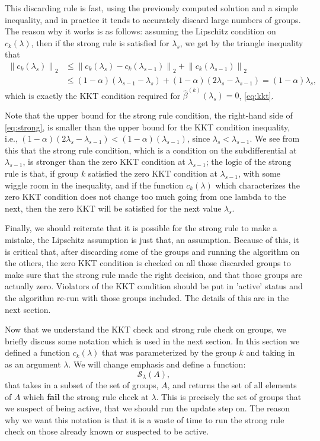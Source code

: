 \documentclass[12pt]{article}
\newcommand{\norm}[1]{\left\lVert #1 \right\rVert}
\begin{document}
This discarding rule is fast, using the previously computed solution and a simple inequality, and in practice it tends to accurately discard large numbers of groups. The reason why it works is as follows: assuming the Lipschitz condition on $c_k(\lambda)$, then if the strong rule is satisfied for $\lambda_s$, we get by the triangle inequality that
\begin{align*}
\norm{c_k(\lambda_s)}_2 &\leq \norm{c_k(\lambda_s) - c_k(\lambda_{s-1})}_2 + \norm{c_k(\lambda_{s-1})}_2 \\
&\leq (1-\alpha)(\lambda_{s-1} - \lambda_s) + (1-\alpha)(2\lambda_s - \lambda_{s-1})
=(1-\alpha)\lambda_s,
\end{align*}
which is exactly the KKT condition required for $\hat{\beta}^{(k)}(\lambda_s) = 0$, \autoref{eq:kkt}.

Note that the upper bound for the strong rule condition, the right-hand side of \autoref{eq:strong}, is smaller than the upper bound for the KKT condition inequality, i.e., $(1-\alpha)(2\lambda_s - \lambda_{s-1}) < (1-\alpha)(\lambda_{s-1})$, since $\lambda_{s} < \lambda_{s-1}$. We see from this that the strong rule condition, which is a condition on the subdifferential at $\lambda_{s-1}$, is stronger than the zero KKT condition at $\lambda_{s-1}$; the logic of the strong rule is that, if group $k$ satisfied the zero KKT condition at $\lambda_{s-1}$, with some wiggle room in the inequality, and if the function $c_k(\lambda)$ which characterizes the zero KKT condition does not change too much going from one lambda to the next, then the zero KKT will be satisfied for the next value $\lambda_s$.

Finally, we should reiterate that it is possible for the strong rule to make a mistake, the Lipschitz assumption is just that, an assumption. Because of this, it is critical that, after discarding some of the groups and running the algorithm on the others, the zero KKT condition is checked on all those discarded groups to make sure that the strong rule made the right decision, and that those groups are actually zero. Violators of the KKT condition should be put in 'active' status and the algorithm re-run with those groups included. The details of this are in the next section.

Now that we understand the KKT check and strong rule check on groups, we briefly discuss some notation which is used in the next section. In this section we defined a function $c_k(\lambda)$ that was parameterized by the group $k$ and taking in as an argument $\lambda$. We will change emphasis and define a function:
\[
\mathcal{S}_{\lambda}(A),
\]
that takes in a subset of the set of groups, $A$, and returns the set of all elements of $A$ which \textbf{fail} the strong rule check at $\lambda$. This is precisely the set of groups that we suspect of being active, that we should run the update step on. The reason why we want this notation is that it is a waste of time to run the strong rule check on those already known or suspected to be active. 
\end{document}
